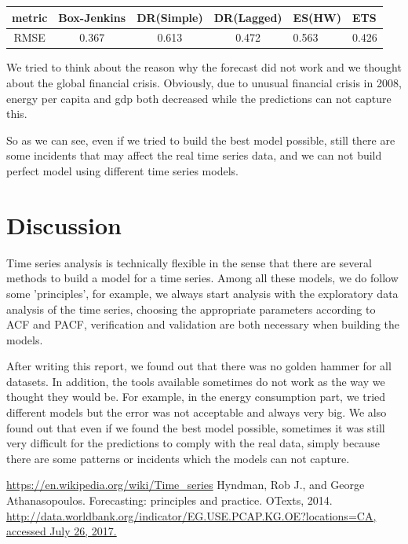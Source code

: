 \documentclass[journal, a4paper]{IEEEtran}
\begin{document}
\begin{table}[H]
\begin{tabular}{|c|c|c|c|p{0.8cm}|p{0.6cm}|}
\hline
metric & Box-Jenkins & DR(Simple) & DR(Lagged) & ES(HW) & ETS \\ \hline
RMSE & 0.367 & 0.613 & 0.472 & 0.563 & 0.426 \\
\hline
\end{tabular}
\end{table}



We tried to think about the reason why the forecast did not work and we thought about the global financial crisis.
Obviously, due to unusual financial crisis in 2008, energy per capita and gdp both decreased while the predictions can not capture this.  

So as we can see, even if we tried to build the best model possible, still there are some incidents that may affect the real time series data, and we can not build perfect model using different time series models.

\section{Discussion}
Time series analysis is technically flexible in the sense that there are several methods to build a model for a time series. Among all these models, we do follow some 'principles', for example, we always start analysis with the exploratory data analysis of the time series, choosing the appropriate parameters according to ACF and PACF, verification and validation are both necessary when building the models.

After writing this report, we found out that there was no golden hammer for all datasets. In addition, the tools available sometimes do not work as the way we thought they would be. For example, in the energy consumption part, we tried different models but the error was not acceptable and always very big. We also found out that even if we found the best model possible, sometimes it was still very difficult for the predictions to comply with the real data, simply because there are some patterns or incidents which the models can not capture.


\begin{thebibliography}{5}
\url{https://en.wikipedia.org/wiki/Time_series}
	Hyndman, Rob J., and George Athanasopoulos. Forecasting: principles and practice. OTexts, 2014.
\url{http://data.worldbank.org/indicator/EG.USE.PCAP.KG.OE?locations=CA, accessed July 26, 2017.}
\end{thebibliography}
\end{document}
